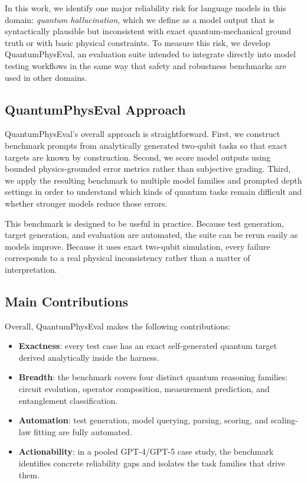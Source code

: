 \documentclass[11pt]{article}
\begin{document}
In this work, we identify one major reliability risk for language models in this domain: \emph{quantum hallucination}, which we define as a model output that is syntactically plausible but inconsistent with exact quantum-mechanical ground truth or with basic physical constraints. To measure this risk, we develop QuantumPhysEval, an evaluation suite intended to integrate directly into model testing workflows in the same way that safety and robustness benchmarks are used in other domains.

\subsection{QuantumPhysEval Approach}
QuantumPhysEval's overall approach is straightforward. First, we construct benchmark prompts from analytically generated two-qubit tasks so that exact targets are known by construction. Second, we score model outputs using bounded physics-grounded error metrics rather than subjective grading. Third, we apply the resulting benchmark to multiple model families and prompted depth settings in order to understand which kinds of quantum tasks remain difficult and whether stronger models reduce those errors.

This benchmark is designed to be useful in practice. Because test generation, target generation, and evaluation are automated, the suite can be rerun easily as models improve. Because it uses exact two-qubit simulation, every failure corresponds to a real physical inconsistency rather than a matter of interpretation.

\subsection{Main Contributions}
Overall, QuantumPhysEval makes the following contributions:
\begin{itemize}
\item \textbf{Exactness}: every test case has an exact self-generated quantum target derived analytically inside the harness.
\item \textbf{Breadth}: the benchmark covers four distinct quantum reasoning families: circuit evolution, operator composition, measurement prediction, and entanglement classification.
\item \textbf{Automation}: test generation, model querying, parsing, scoring, and scaling-law fitting are fully automated.
\item \textbf{Actionability}: in a pooled GPT-4/GPT-5 case study, the benchmark identifies concrete reliability gaps and isolates the task families that drive them.
\end{itemize}
\end{document}
